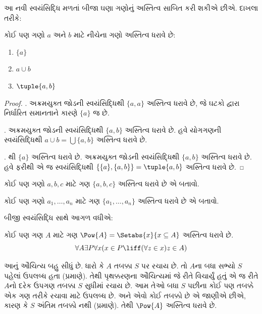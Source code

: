 આ નવી સ્વયંસિદ્ધિ મળતાં બીજા ઘણા ગણોનું અસ્તિત્વ સાબિત કરી
શકીએ છીએ. દાખલા તરીકે:

\begin{prop}
કોઈ પણ ગણો $a$ અને $b$ માટે નીચેના ગણો અસ્તિત્વ ધરાવે છે:
\begin{enumerate}
\item{} $\{a\}$
\item{} $a \cup b$
\item{} $\tuple{a, b}$
\end{enumerate}
\end{prop}

\begin{proof}
. અક્રમયુક્ત જોડની સ્વયંસિદ્ધિથી $\{a, a\}$
અસ્તિત્વ ધરાવે છે, જે ઘટકો દ્વારા નિર્ધારિત સમાનતાને કારણે
$\{a\}$ જ છે.

. અક્રમયુક્ત જોડની સ્વયંસિદ્ધિથી $\{a, b\}$
અસ્તિત્વ ધરાવે છે. હવે યોગગણની સ્વયંસિદ્ધિથી
$a \cup b = \bigcup
\{a, b\}$ અસ્તિત્વ ધરાવે છે.

. થી $\{a\}$ અસ્તિત્વ ધરાવે છે.
અક્રમયુક્ત જોડની સ્વયંસિદ્ધિથી $\{a,
b\}$ અસ્તિત્વ ધરાવે છે. હવે ફરીથી એ જ સ્વયંસિદ્ધિથી
$\{\{a\}, \{a, b\}\} = \tuple{a, b}$ અસ્તિત્વ ધરાવે છે.
\end{proof}

\begin{prob}
કોઈ પણ ગણો $a, b, c$ માટે ગણ $\{a, b, c\}$ અસ્તિત્વ ધરાવે છે
એ બતાવો.
\end{prob}

\begin{prob}
કોઈ પણ ગણો $a_1, \ldots, a_n$ માટે ગણ $\{a_1, \ldots,
a_n\}$ અસ્તિત્વ ધરાવે છે એ બતાવો.
\end{prob}
\endgroup

\begingroup
\makeatletter{}\makeatother

\label{guunit:OLP-0542}


બીજી સ્વયંસિદ્ધિ સાથે આગળ વધીએ:

\begin{axiom}[ઘાતગણો]
કોઈ પણ ગણ $A$ માટે ગણ $\Pow{A} = \Setabs{x}{x \subseteq A}$
અસ્તિત્વ ધરાવે છે.
\[
\forall A \exists P \forall x(x \in P \liff (\forall z \in x)z \in A)
\]
\end{axiom}

આનું ઔચિત્ય બહુ સીધું છે. ધારો કે $A$ તબક્કા $S$ પર રચાય છે.
તો $A$ના બધા સભ્યો $S$ પહેલાં ઉપલબ્ધ હતા (\stagesacc પ્રમાણે).
તેથી પૃથક્કરણના ઔચિત્યમાં જે રીતે વિચાર્યું હતું એ જ રીતે
$A$નો દરેક ઉપગણ તબક્કા $S$ સુધીમાં રચાય છે. આમ તેઓ બધા
$S$ પછીના કોઈ પણ તબક્કે એક ગણ તરીકે રચાવા માટે ઉપલબ્ધ છે.
અને એવો કોઈ તબક્કો છે એ જાણીએ છીએ, કારણ કે $S$ અંતિમ તબક્કો
નથી (\stagessucc પ્રમાણે). તેથી $\Pow{A}$ અસ્તિત્વ ધરાવે છે.

